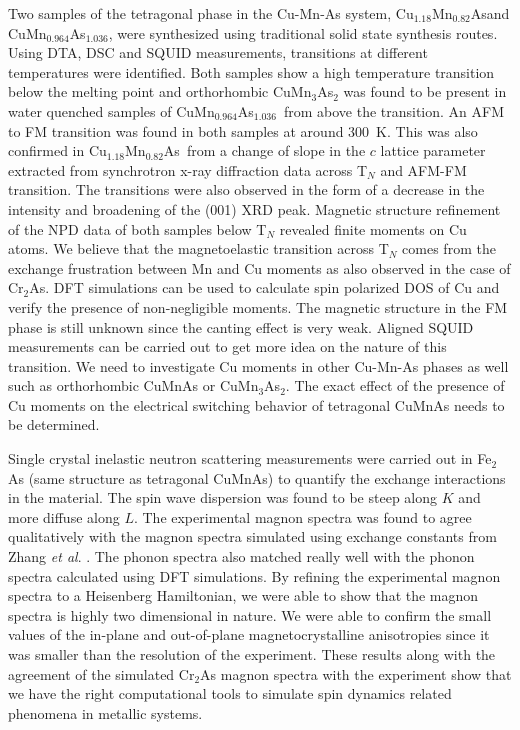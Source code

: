 \documentclass[letterpaper,10pt,doublespacing,edeposit]{uiucthesis2020}
\newcommand*{\cuexcess}{Cu$_{1.18}$Mn$_{0.82}$As}
\newcommand*{\asexcess}{CuMn$_{0.964}$As$_{1.036}$}
\begin{document}
\begin{mainmatter}
Two samples of the tetragonal phase in the Cu-Mn-As system, \cuexcess and \asexcess, were synthesized using traditional solid state synthesis routes. Using DTA, DSC and SQUID measurements, transitions at different temperatures were identified. Both samples show a high temperature transition below the melting point and orthorhombic CuMn$_3$As$_2$ was found to be present in water quenched samples of \asexcess\ from above the transition. An AFM to FM transition was found in both samples at around 300~K. This was also confirmed  in \cuexcess\ from a change of slope in the $c$ lattice parameter extracted from synchrotron x-ray diffraction data across T$_N$ and AFM-FM transition. The transitions were also observed in the form of a decrease in the intensity and broadening of the (001) XRD peak. Magnetic structure refinement of the NPD data of both samples below T$_N$ revealed finite moments on Cu atoms. We believe that the magnetoelastic transition across T$_N$ comes from the exchange frustration between Mn and Cu moments as also observed in the case of Cr$_2$As. DFT simulations can be used to calculate spin polarized DOS of Cu and verify the presence of non-negligible moments. The magnetic structure in the FM phase is still unknown since the canting effect is very weak. Aligned SQUID measurements can be carried out to get more idea on the nature of this transition. We need to investigate Cu moments in other Cu-Mn-As phases as well such as orthorhombic CuMnAs or CuMn$_3$As$_2$. The exact effect of the presence of Cu moments on the electrical switching behavior of tetragonal CuMnAs needs to be determined.


Single crystal inelastic neutron scattering measurements were carried out in Fe$_2$As (same structure as tetragonal CuMnAs) to quantify the exchange interactions in the material. The spin wave dispersion was found to be steep along $K$ and more diffuse along $L$. The experimental magnon spectra was found to agree qualitatively with the magnon spectra simulated using exchange constants from Zhang \emph{et al}. \cite{Zhang2013}. The phonon spectra also matched really well with the phonon spectra calculated using DFT simulations. By refining the experimental magnon spectra to a Heisenberg Hamiltonian, we were able to show that the magnon spectra is highly two dimensional in nature. We were able to confirm the small values of the in-plane and out-of-plane magnetocrystalline anisotropies since it was smaller than the resolution of the experiment. These results along with the agreement of the simulated Cr$_2$As magnon spectra with the experiment show that we have the right computational tools to simulate spin dynamics related phenomena in metallic systems.

\end{mainmatter}



\begin{backmatter}




\end{backmatter}



\end{document}
